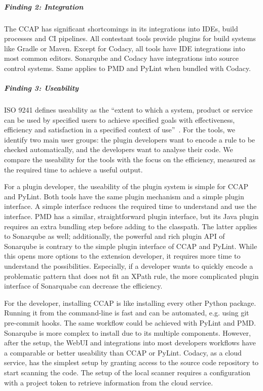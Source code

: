 \subparagraph{Finding 2: Integration}
The CCAP has significant shortcomings in its integrations into IDEs, build processes and CI pipelines. All contestant tools provide plugins for build systems like Gradle or Maven. Except for Codacy, all tools have IDE integrations into most common editors. Sonarqube and Codacy have integrations into source control systems. Same applies to PMD and PyLint when bundled with Codacy.

\subparagraph{Finding 3: Useability}
ISO 9241 defines useability as the \enquote{extent to which a system, product or service can be used by specified users to achieve specified goals with effectiveness, efficiency and satisfaction in a specified context of use}~\cite{isotc_159sc_4_iso_2018}. For the tools, we identify two main user groups: the plugin developers want to encode a rule to be checked automatically, and the developers want to analyse their code. We compare the useability for the tools with the focus on the efficiency, measured as the required time to achieve a useful output.

For a plugin developer, the useability of the plugin system is simple for CCAP and PyLint. Both tools have the same plugin mechanism and a simple plugin interface. A simple interface reduces the required time to understand and use the interface.
PMD has a similar, straightforward plugin interface, but its Java plugin requires an extra bundling step before adding to the classpath. The latter applies to Sonarqube as well; additionally, the powerful and rich plugin API of Sonarqube is contrary to the simple plugin interface of CCAP and PyLint. While this opens more options to the extension developer, it requires more time to understand the possibilities. Especially, if a developer wants to quickly encode a problematic pattern that does not fit an XPath rule, the more complicated plugin interface of Sonarquabe can decrease the efficiency. 

For the developer, installing CCAP is like installing every other Python package. Running it from the command-line is fast and can be automated, e.g. using git pre-commit hooks. The same workflow could be achieved with PyLint and PMD. Sonarqube is more complex to install due to its multiple components. However, after the setup, the WebUI and integrations into most developers workflows have a comparable or better useability than CCAP or PyLint. Codacy, as a cloud service, has the simplest setup by granting access to the source code repository to start scanning the code. The setup of the local scanner requires a configuration with a project token to retrieve information from the cloud service.

